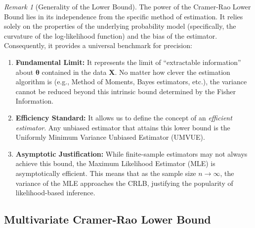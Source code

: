 \documentclass[
  letterpaper,
  DIV=11,
  numbers=noendperiod]{scrreprt}
\providecommand{\tightlist}{%
  \setlength{\itemsep}{0pt}\setlength{\parskip}{0pt}}
\renewcommand{\[}{\begin{equation}}
\renewcommand{\]}{\end{equation}}
\theoremstyle{definition}
\theoremstyle{plain}
\theoremstyle{plain}
\theoremstyle{plain}
\theoremstyle{definition}
\theoremstyle{plain}
\theoremstyle{remark}
\newtheorem{refremark}{Remark}[chapter]
\begin{document}
\begin{refremark}[Generality of the Lower Bound]
The power of the Cramer-Rao Lower Bound lies in its independence from
the specific method of estimation. It relies solely on the properties of
the underlying probability model (specifically, the curvature of the
log-likelihood function) and the bias of the estimator. Consequently, it
provides a universal benchmark for precision:

\begin{enumerate}
\def\labelenumi{\arabic{enumi}.}
\tightlist
\item
  \textbf{Fundamental Limit:} It represents the limit of ``extractable
  information'' about \(\boldsymbol{\theta}\) contained in the data
  \(\mathbf{X}\). No matter how clever the estimation algorithm is
  (e.g., Method of Moments, Bayes estimators, etc.), the variance cannot
  be reduced beyond this intrinsic bound determined by the Fisher
  Information.
\item
  \textbf{Efficiency Standard:} It allows us to define the concept of an
  \emph{efficient estimator}. Any unbiased estimator that attains this
  lower bound is the Uniformly Minimum Variance Unbiased Estimator
  (UMVUE).
\item
  \textbf{Asymptotic Justification:} While finite-sample estimators may
  not always achieve this bound, the Maximum Likelihood Estimator (MLE)
  is asymptotically efficient. This means that as the sample size
  \(n \to \infty\), the variance of the MLE approaches the CRLB,
  justifying the popularity of likelihood-based inference.
\end{enumerate}

\label{rem-crlb-generality}

\end{refremark}

\subsection{Multivariate Cramer-Rao Lower
Bound}\label{multivariate-cramer-rao-lower-bound}
\end{document}
